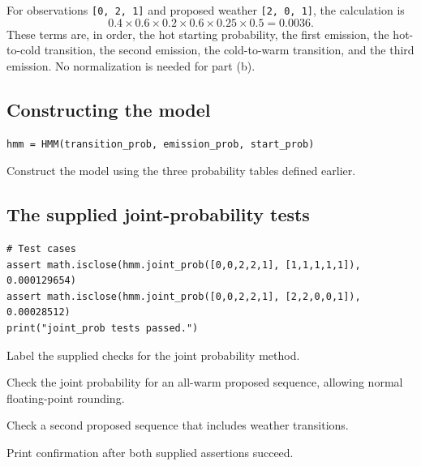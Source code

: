 \documentclass[11pt,a4paper]{article}
\begin{document}
For observations \texttt{[0, 2, 1]} and proposed weather
\texttt{[2, 0, 1]}, the calculation is
\[
0.4\times0.6\times0.2\times0.6\times0.25\times0.5=0.0036.
\]
These terms are, in order, the hot starting probability, the first emission,
the hot-to-cold transition, the second emission, the cold-to-warm transition,
and the third emission. No normalization is needed for part (b).
\subsection{Constructing the model}
\begin{lstlisting}
hmm = HMM(transition_prob, emission_prob, start_prob)
\end{lstlisting}
\begin{description}[style=nextline,leftmargin=19mm,font=\normalfont\bfseries]
\item[Line 1.] Construct the model using the three probability tables defined earlier.
\end{description}
\subsection{The supplied joint-probability tests}
\begin{lstlisting}
# Test cases
assert math.isclose(hmm.joint_prob([0,0,2,2,1], [1,1,1,1,1]), 0.000129654)
assert math.isclose(hmm.joint_prob([0,0,2,2,1], [2,2,0,0,1]), 0.00028512)
print("joint_prob tests passed.")
\end{lstlisting}
\begin{description}[style=nextline,leftmargin=19mm,font=\normalfont\bfseries]
\item[Line 1.] Label the supplied checks for the joint probability method.
\item[Line 2.] Check the joint probability for an all-warm proposed sequence, allowing normal floating-point rounding.
\item[Line 3.] Check a second proposed sequence that includes weather transitions.
\item[Line 4.] Print confirmation after both supplied assertions succeed.
\end{description}
\end{document}

